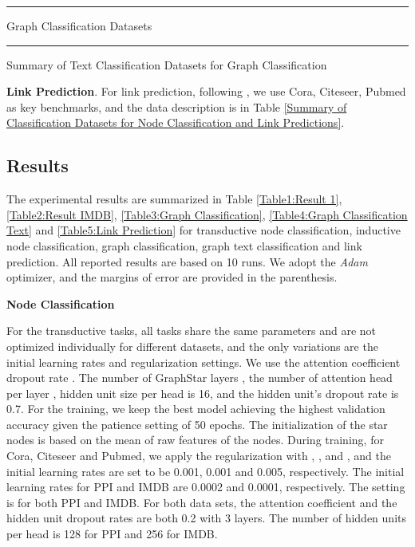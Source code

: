 \documentclass{article}
\begin{document}
\begin{table}[!ht]
\centering
{}
\rule{\linewidth}{0cm}
\caption{\label{Table3:Graph Classification Datasets} Graph Classification Datasets}
\end{table}
\vspace*{-\baselineskip}

\begin{table}[!ht]
\centering
{}
\rule{\linewidth}{0cm}
\caption{\label{Table2:Graph Text Classification Datasets}Summary of Text Classification Datasets for Graph Classification}
\end{table}


\textbf{Link Prediction}. For link prediction, following \cite{DBLP:journals/corr/abs-1811-02798}, we use Cora, Citeseer, Pubmed as key benchmarks, and the data description is in Table \ref{Summary of Classification Datasets for Node Classification and Link Predictions}.



\subsection{Results}

The experimental results are summarized in Table \ref{Table1:Result 1}, \ref{Table2:Result IMDB}, \ref{Table3:Graph Classification}, \ref{Table4:Graph Classification Text} and \ref{Table5:Link Prediction} for transductive node classification, inductive node classification, graph classification, graph text classification and link prediction. All reported results are based on 10 runs. We adopt the \textit{Adam} optimizer, and the margins of error are provided in the parenthesis.

\textbf{Node Classification}

For the transductive tasks, all tasks share the same parameters and are not optimized individually for different datasets, and the only variations are the initial learning rates and  regularization settings. We use the attention coefficient dropout rate . The number of GraphStar layers , the number of attention head per layer , hidden unit size per head is 16, and the hidden unit's dropout rate is 0.7. For the training, we keep the best model achieving the highest validation accuracy given the patience setting of 50 epochs. The initialization of the star nodes is based on the mean of raw features of the nodes. During training, for Cora, Citeseer and Pubmed, we apply the  regularization with , , and , and the initial learning rates are set to be 0.001, 0.001 and 0.005, respectively. The initial learning rates for PPI and IMDB are 0.0002 and 0.0001, respectively. The  setting is  for both PPI and IMDB. For both data sets, the attention coefficient and the hidden unit dropout rates are both 0.2 with 3 layers. The number of hidden units per head is 128 for PPI and 256 for IMDB.
\end{document}
